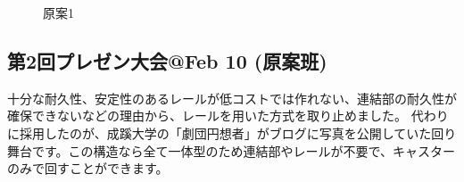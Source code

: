 \documentclass{jsarticle}
\begin{document}
\begin{figure}[htbp]
    \centering
    \caption{原案1}
    \label{figs:原案1}
\end{figure}

\clearpage

\subsection{第2回プレゼン大会@Feb 10 (原案班)}

十分な耐久性、安定性のあるレールが低コストでは作れない、連結部の耐久性が確保できないなどの理由から、レールを用いた方式を取り止めました。
代わりに採用したのが、成蹊大学の「劇団円想者」がブログに写真を公開していた回り舞台です。この構造なら全て一体型のため連結部やレールが不要で、キャスターのみで回すことができます。
\end{document}
